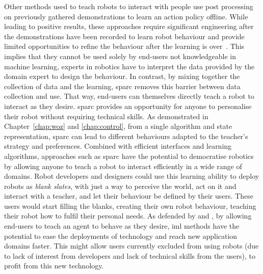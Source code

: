 
Other methods used to teach robots to interact with people use post processing on previously gathered demonstrations to learn an action policy offline. While leading to positive results, these approaches require significant engineering after the demonstrations have been recorded to learn robot behaviour and provide limited opportunities to refine the behaviour after the learning is over~\citep{liu2014train,sequeira2016discovering}. This implies that they cannot be used solely by end-users not knowledgeable in machine learning, experts in robotics have to interpret the data provided by the domain expert to design the behaviour. In contrast, by mixing together the collection of data and the learning, \gls{sparc} removes this barrier between data collection and use. That way, end-users can themselves directly teach a robot to interact as they desire.
\gls{sparc} provides an opportunity for anyone to personalise their robot without requiring technical skills. As demonstrated in Chapter~\ref{chap:woz} and \ref{chap:control}, from a single algorithm and state representation, \gls{sparc} can lead to different behaviours adapted to the teacher's strategy and preferences. Combined with efficient interfaces and learning algorithms, approaches such as \gls{sparc} have the potential to democratise robotics by allowing anyone to teach a robot to interact efficiently in a wide range of domains. Robot developers and designers could use this learning ability to deploy robots as \emph{blank slates}, with just a way to perceive the world, act on it and interact with a teacher, and let their behaviour be defined by their users. These users would start filling the blanks, creating their own robot behaviour, teaching their robot how to fulfil their personal needs. As defended by \cite{fails2003interactive} and \cite{amershi2014power}, by allowing end-users to teach an agent to behave as they desire, \gls{iml} methods have the potential to ease the deployments of technology and reach new application domains faster. This might allow users currently excluded from using robots (due to lack of interest from developers and lack of technical skills from the users), to profit from this new technology.

